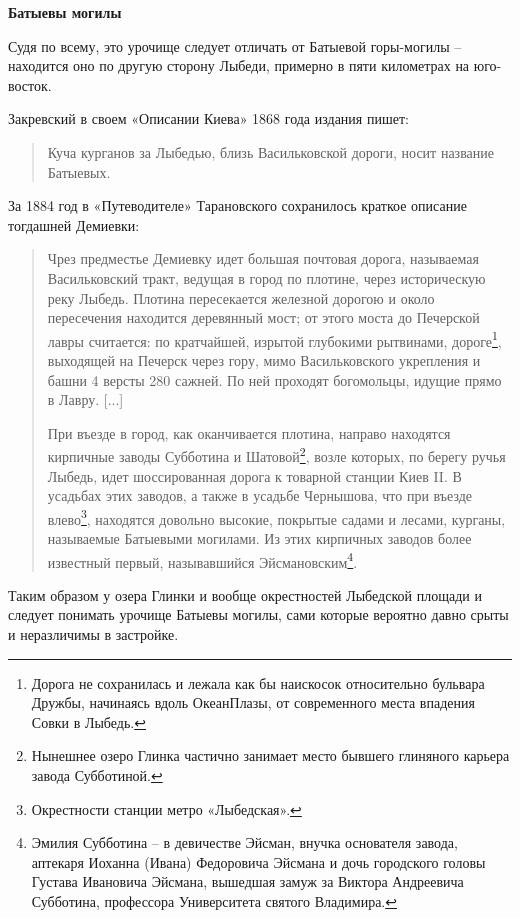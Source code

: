 \medskip


\textbf{Батыевы могилы}

Судя по всему, это урочище следует отличать от Батыевой горы-могилы – находится оно по другую сторону Лыбеди, примерно в пяти километрах на юго-восток.

Закревский в своем «Описании Киева» 1868 года издания пишет:

\begin{quotation}
\noindent Куча курганов за Лыбедью, близь Васильковской дороги, носит название Батыевых.
\end{quotation}

За 1884 год в «Путеводителе» Тарановского сохранилось краткое описание тогдашней Демиевки:

\begin{quotation}
Чрез предместье Демиевку идет большая почтовая дорога, называемая Васильковский тракт, ведущая в город по плотине, через историческую реку Лыбедь. Плотина пересекается железной дорогою и около пересечения находится деревянный мост; от этого моста до Печерской лавры считается: по кратчайшей, изрытой глубокими рытвинами, дороге\footnote{Дорога не сохранилась и лежала как бы наискосок относительно бульвара Дружбы, начинаясь вдоль ОкеанПлазы, от современного места впадения Совки в Лыбедь.}, выходящей на Печерск через гору, мимо Васильковского укрепления и башни 4 версты 280 сажней. По ней проходят богомольцы, идущие прямо в Лавру. [...]

При въезде в город, как оканчивается плотина, направо находятся кирпичные заводы Субботина и Шатовой\footnote{Нынешнее озеро Глинка частично занимает место бывшего глиняного карьера завода Субботиной.}, возле которых, по берегу ручья Лыбедь, идет шоссированная дорога к товарной станции Киев II. В усадьбах этих заводов, а также в усадьбе Чернышова, что при въезде влево\footnote{Окрестности станции метро «Лыбедская».}, находятся довольно высокие, покрытые садами и лесами, курганы, называемые Батыевыми могилами. Из этих кирпичных заводов более известный первый, называвшийся Эйсмановским\footnote{Эмилия Субботина – в девичестве Эйсман, внучка основателя завода, аптекаря Иоханна (Ивана) Федоровича Эйсмана и дочь городского головы Густава Ивановича Эйсмана, вышедшая замуж за Виктора Андреевича Субботина, профессора Университета святого Владимира.}. 
\end{quotation}

Таким образом у озера Глинки и вообще окрестностей Лыбедской площади и следует понимать урочище Батыевы могилы, сами которые вероятно давно срыты и неразличимы в застройке.\\


